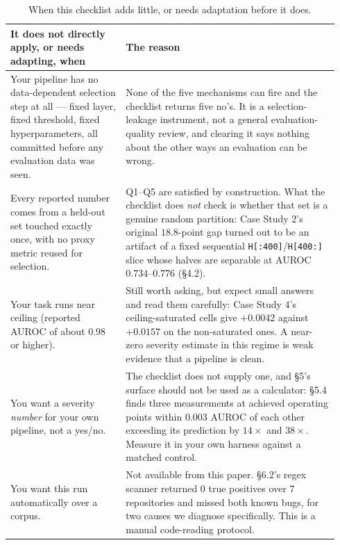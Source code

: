 \documentclass[10pt]{article} %
\begin{document}
\begin{table}[h]
\centering
\small
\begin{tabular}{@{}p{0.33\linewidth}p{0.61\linewidth}@{}}
\toprule
It does not directly apply, or needs adapting, when & The reason \\
\midrule
Your pipeline has no data-dependent selection step at all --- fixed layer, fixed threshold, fixed hyperparameters, all committed before any evaluation data was seen. & None of the five mechanisms can fire and the checklist returns five no's. It is a selection-leakage instrument, not a general evaluation-quality review, and clearing it says nothing about the other ways an evaluation can be wrong. \\
\addlinespace
Every reported number comes from a held-out set touched exactly once, with no proxy metric reused for selection. & Q1--Q5 are satisfied by construction. What the checklist does \emph{not} check is whether that set is a genuine random partition: Case Study 2's original $18.8$-point gap turned out to be an artifact of a fixed sequential \texttt{H[:400]}/\texttt{H[400:]} slice whose halves are separable at AUROC $0.734$--$0.776$ (§4.2). \\
\addlinespace
Your task runs near ceiling (reported AUROC of about $0.98$ or higher). & Still worth asking, but expect small answers and read them carefully: Case Study 4's ceiling-saturated cells give $+0.0042$ against $+0.0157$ on the non-saturated ones. A near-zero severity estimate in this regime is weak evidence that a pipeline is clean. \\
\addlinespace
You want a severity \emph{number} for your own pipeline, not a yes/no. & The checklist does not supply one, and §5's surface should not be used as a calculator: §5.4 finds three measurements at achieved operating points within $0.003$ AUROC of each other exceeding its prediction by $14\times$ and $38\times$. Measure it in your own harness against a matched control. \\
\addlinespace
You want this run automatically over a corpus. & Not available from this paper. §6.2's regex scanner returned $0$ true positives over $7$ repositories and missed both known bugs, for two causes we diagnose specifically. This is a manual code-reading protocol. \\
\bottomrule
\end{tabular}
\caption{When this checklist adds little, or needs adaptation before it does.}
\label{tab:checklist-scope-neg}
\end{table}
\end{document}
